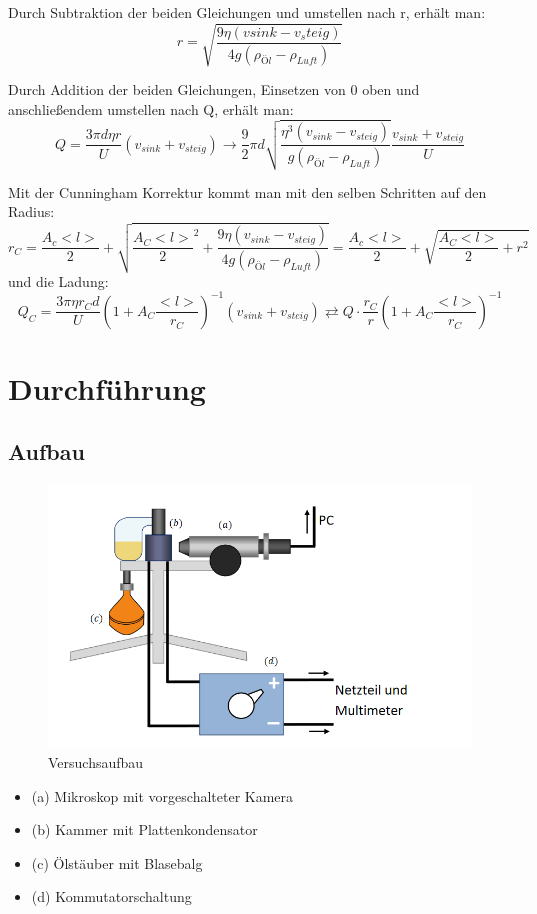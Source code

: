 \documentclass{scrartcl}
\begin{document}
			Durch Subtraktion der beiden Gleichungen und umstellen nach r, erhält man:
			\begin{equation}
				r = \sqrt{\frac{9 \eta (v{sink} - v_steig)}{4 g (\rho_{Öl} - \rho_{Luft})}}
			\end{equation}

			Durch Addition der beiden Gleichungen, Einsetzen von 0 oben und anschließendem umstellen nach Q, erhält man:
			\begin{equation}
				Q = \frac{3 \pi d \eta r}{U} (v_{sink} + v_{steig})
				\rightarrow \frac{9}{2} \pi d \sqrt{\frac{\eta^3 (v_{sink} - v_{steig})}{g (\rho_{Öl} - \rho_{Luft})}} \frac{v_{sink} + v_{steig}}{U} 
			\end{equation}

			Mit der Cunningham Korrektur kommt man mit den selben Schritten auf den Radius:
			\begin{equation}
				r_C = \frac{A_c <l>}{2} + \sqrt{\frac{A_C <l>}{2}^2 +\frac{9 \eta (v_{sink} - v_{steig})}{4 g (\rho_{Öl} - \rho_{Luft})}}
					= \frac{A_c <l>}{2} + \sqrt{\frac{A_C <l>}{2} + r^2}
			\end{equation}
			und die Ladung:
			\begin{equation}
				Q_C = \frac{3 \pi \eta r_C d}{U} (1 + A_C \frac{<l>}{r_C})^{-1} (v_{sink} + v_{steig})
				\rightleftarrows Q \cdot \frac{r_C}{r} (1 + A_C \frac{<l>}{r_C})^{-1} 
			\end{equation}

\section{Durchführung}
	\subsection{Aufbau}
		\begin{figure}[H]
			\centering
			\includegraphics[width=1.0\textwidth]{Versuchsaufbau.PNG}
			\caption{Versuchsaufbau}
		\end{figure}
		\begin{itemize}
			\item (a) Mikroskop mit vorgeschalteter Kamera
			\item (b) Kammer mit Plattenkondensator
			\item (c) Ölstäuber mit Blasebalg
			\item (d) Kommutatorschaltung
		\end{itemize}
\end{document}
